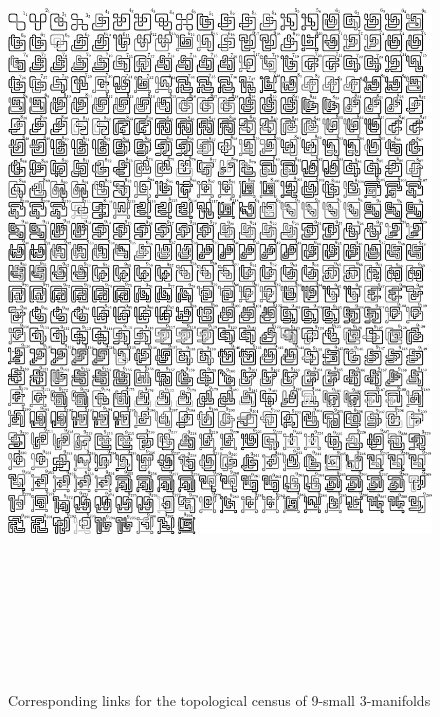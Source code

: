 \newpage

\begin{figure}[h!tp]
   \begin{center}
      \leavevmode
      \includegraphics[height=22.0cm]{E.figsbw2/primespace489representantlinks_bw.pdf}
   \end{center}
   \vspace{-0.7cm}
   \caption{Corresponding links for the topological census of 9-small 3-manifolds}
   \label{fig:primeSpace487RepresentativeLinks}
\end{figure}

\newpage

